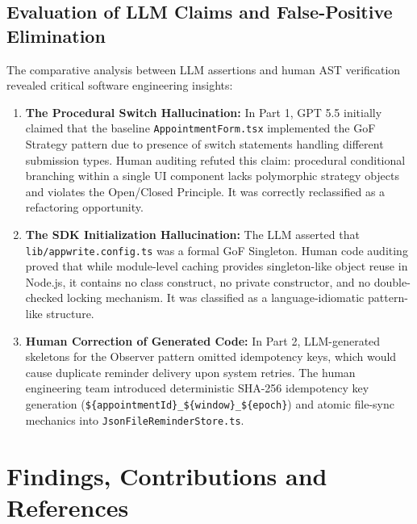 \documentclass[11pt,a4paper]{article}
\begin{document}
\subsection{Evaluation of LLM Claims and False-Positive Elimination}
The comparative analysis between LLM assertions and human AST verification revealed critical software engineering insights:
\begin{enumerate}
\item \textbf{The Procedural Switch Hallucination:} In Part 1, GPT 5.5 initially claimed that the baseline \texttt{AppointmentForm.tsx} implemented the GoF Strategy pattern due to presence of switch statements handling different submission types. Human auditing refuted this claim: procedural conditional branching within a single UI component lacks polymorphic strategy objects and violates the Open/Closed Principle. It was correctly reclassified as a refactoring opportunity.
\item \textbf{The SDK Initialization Hallucination:} The LLM asserted that \texttt{lib/appwrite.config.ts} was a formal GoF Singleton. Human code auditing proved that while module-level caching provides singleton-like object reuse in Node.js, it contains no class construct, no private constructor, and no double-checked locking mechanism. It was classified as a language-idiomatic pattern-like structure.
\item \textbf{Human Correction of Generated Code:} In Part 2, LLM-generated skeletons for the Observer pattern omitted idempotency keys, which would cause duplicate reminder delivery upon system retries. The human engineering team introduced deterministic SHA-256 idempotency key generation (\texttt{\$\{appointmentId\}\_\$\{window\}\_\$\{epoch\}}) and atomic file-sync mechanics into \texttt{JsonFileReminderStore.ts}.
\end{enumerate}

\section{Findings, Contributions and References}
\end{document}
